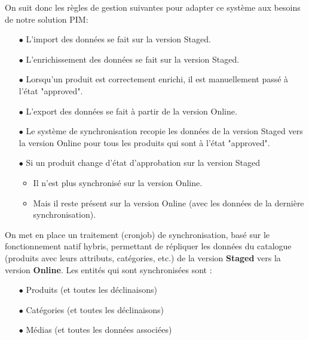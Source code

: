 On suit donc les règles de gestion suivantes pour adapter ce système aux besoins de notre solution PIM:

\medskip

\begin{itemize}
    \item[$\bullet$] L'import des données se fait sur la version Staged.
    \medskip
    \item[$\bullet$] L'enrichissement des données se fait sur la version Staged.
    \medskip
    \item[$\bullet$] Lorsqu'un produit est correctement enrichi, il est manuellement passé à l'état "approved". 
    \medskip
    \item[$\bullet$] L'export des données se fait à partir de la version Online.
    \medskip
    \item[$\bullet$] Le système de synchronisation recopie les données de la version Staged vers la version Online pour tous les produits qui sont à l'état "approved".
    \medskip
    \item[$\bullet$] Si un produit change d'état d'approbation sur la version Staged
    \smallskip
    
    \begin{itemize}
        \item Il n'est plus synchronisé sur la version Online.
            \smallskip

        \item Mais il reste présent sur la version Online (avec les données de la dernière synchronisation).
    \end{itemize}
\end{itemize}

On met en place un traitement (cronjob) de synchronisation, basé sur le fonctionnement natif hybris, permettant de répliquer les données du catalogue (produits avec leurs attributs, catégories, etc.) de la version \textbf{Staged} vers la version \textbf{Online}. Les entités qui sont synchronisées sont :

\begin{itemize}
        \item[$\bullet$] Produits (et toutes les déclinaisons)
        \smallskip
        \item[$\bullet$] Catégories (et toutes les déclinaisons)
        \smallskip
        \item[$\bullet$] Médias (et toutes les données associées)
\end{itemize}
\medskip

